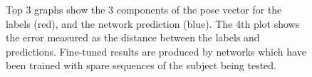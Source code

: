 \documentclass[11pt]{article} %
\begin{document}
\begin{figure}
\qquad
{}%
\qquad
{}%
\qquad
{}%
\caption{Top 3 graphs show the 3 components of the pose vector for the labels (red), and the network prediction (blue). The 4th plot shows the error measured as the distance between the labels and predictions. Fine-tuned results are produced by networks which have been trained with spare sequences of the subject being tested. }
\label{fig:s1-6}
\end{figure}
\end{document}
